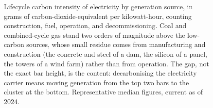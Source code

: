 \begin{figure}[htbp]
\centering
{}
\caption[Lifecycle carbon intensity of electricity by source]{Lifecycle
carbon intensity of electricity by generation source, in grams of
carbon-dioxide-equivalent per kilowatt-hour, counting construction, fuel,
operation, and decommissioning. Coal and combined-cycle gas stand two orders
of magnitude above the low-carbon sources, whose small residue comes from
manufacturing and construction (the concrete and steel of a dam, the silicon
of a panel, the towers of a wind farm) rather than from operation. The gap,
not the exact bar height, is the content: decarbonising the electricity
carrier means moving generation from the top two bars to the cluster at the
bottom. Representative median figures, current as of 2024.}
\label{fig:vol04ch14:lifecycle-carbon}
\end{figure}
